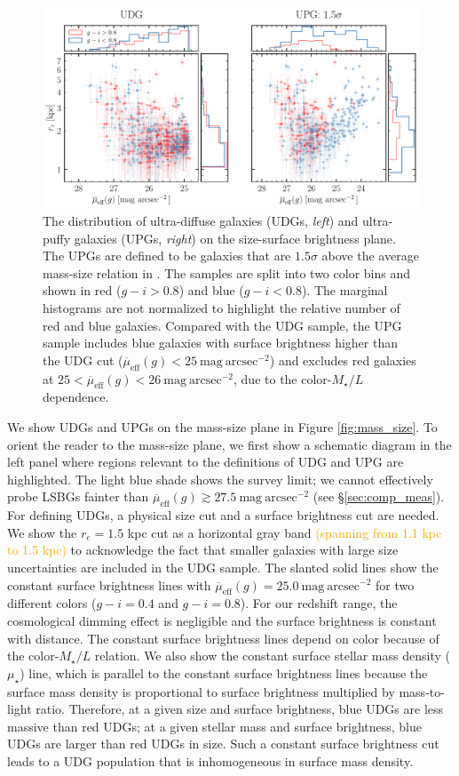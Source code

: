 \documentclass[twocolumn,astrosymb,twocolappendix,linenumbers]{aastex631}
\newcommand{\sbunit}{\mathrm{mag\ arcsec}^{-2}}
\newcommand{\sbeff}{\overline{\mu}_{\mathrm{eff}}(g)}
\newcommand{\emphasize}{\textcolor{orange}}
\begin{document}
\begin{CJK*}{UTF8}{gbsn}
\begin{figure}
	\vbox{ 
		\centering
		\includegraphics[width=1\linewidth]{udg_upg_sample.pdf}
	}
    \caption{The distribution of ultra-diffuse galaxies (UDGs, \textit{left}) and ultra-puffy galaxies (UPGs, \textit{right}) on the size-surface brightness plane. The UPGs are defined to be galaxies that are $1.5\sigma$ above the average mass-size relation in \citet{ELVES-I}. The samples are split into two color bins and shown in red ($g-i>0.8$) and blue ($g-i<0.8$). The marginal histograms are not normalized to highlight the relative number of red and blue galaxies. Compared with the UDG sample, the UPG sample includes blue galaxies with surface brightness higher than the UDG cut ($\sbeff < 25\ \sbunit$) and excludes red galaxies at $25 < \sbeff < 26\ \sbunit$, due to the color-$M_\star/L$ dependence.
    }
    \label{fig:udg_upg_re_mu}
\end{figure}


We show UDGs and UPGs on the mass-size plane in Figure \ref{fig:mass_size}. To orient the reader to the mass-size plane, we first show a schematic diagram in the left panel where regions relevant to the definitions of UDG and UPG are highlighted. The light blue shade shows the survey limit; we cannot effectively probe LSBGs fainter than $\sbeff \gtrsim 27.5\ \sbunit$ (see \S\ref{sec:comp_meas}). 
For defining UDGs, a physical size cut and a surface brightness cut are needed. We show the $r_e = 1.5$ kpc cut as a horizontal gray band \emphasize{(spanning from 1.1 kpc to 1.5 kpc)} to acknowledge the fact that smaller galaxies with large size uncertainties are included in the UDG sample. The slanted solid lines show the constant surface brightness lines with $\sbeff = 25.0\ \sbunit$ for two different colors ($g-i=0.4$ and $g-i=0.8$). For our redshift range, the cosmological dimming effect is negligible and the surface brightness is constant with distance. The constant surface brightness lines depend on color because of the color-$M_\star/L$ relation. We also show the constant surface stellar mass density ($\mu_\star$) line, which is parallel to the constant surface brightness lines because the surface mass density is proportional to surface brightness multiplied by mass-to-light ratio. Therefore, at a given size and surface brightness, blue UDGs are less massive than red UDGs; at a given stellar mass and  surface brightness, blue UDGs are larger than red UDGs in size. Such a constant surface brightness cut leads to a UDG population that is inhomogeneous in surface mass density. 


\end{CJK*}
\end{document}
